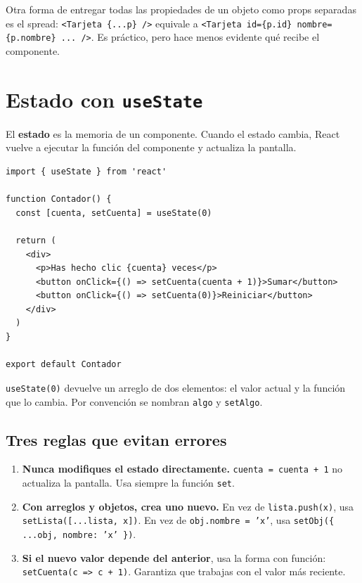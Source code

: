 \documentclass[11pt,a4paper]{article}
\newcommand{\cmd}[1]{\texttt{\color{reactdark}#1}}
\begin{document}
\begin{nota}
Otra forma de entregar todas las propiedades de un objeto como props separadas es el spread: \cmd{<Tarjeta \{...p\} />} equivale a \cmd{<Tarjeta id=\{p.id\} nombre=\{p.nombre\} ... />}. Es práctico, pero hace menos evidente qué recibe el componente.
\end{nota}

\section{Estado con \texttt{useState}}

El \textbf{estado} es la memoria de un componente. Cuando el estado cambia, React vuelve a ejecutar la función del componente y actualiza la pantalla.

\begin{lstlisting}[language=JSX,title={\small\ttfamily src/components/Contador.jsx}]
import { useState } from 'react'

function Contador() {
  const [cuenta, setCuenta] = useState(0)

  return (
    <div>
      <p>Has hecho clic {cuenta} veces</p>
      <button onClick={() => setCuenta(cuenta + 1)}>Sumar</button>
      <button onClick={() => setCuenta(0)}>Reiniciar</button>
    </div>
  )
}

export default Contador
\end{lstlisting}

\cmd{useState(0)} devuelve un arreglo de dos elementos: el valor actual y la función que lo cambia. Por convención se nombran \cmd{algo} y \cmd{setAlgo}.

\subsection{Tres reglas que evitan errores}

\begin{enumerate}[leftmargin=*]
  \item \textbf{Nunca modifiques el estado directamente.} \cmd{cuenta = cuenta + 1} no actualiza la pantalla. Usa siempre la función \cmd{set}.
\sloppy   \item \textbf{Con arreglos y objetos, crea uno nuevo.} En vez de \cmd{lista.push(x)}, usa \cmd{setLista([...lista, x])}. En vez de \cmd{obj.nombre = 'x'}, usa \cmd{setObj(\{ ...obj, nombre: 'x' \})}.
  \item \textbf{Si el nuevo valor depende del anterior}, usa la forma con función: \cmd{setCuenta(c => c + 1)}. Garantiza que trabajas con el valor más reciente.
\end{enumerate}
\end{document}
